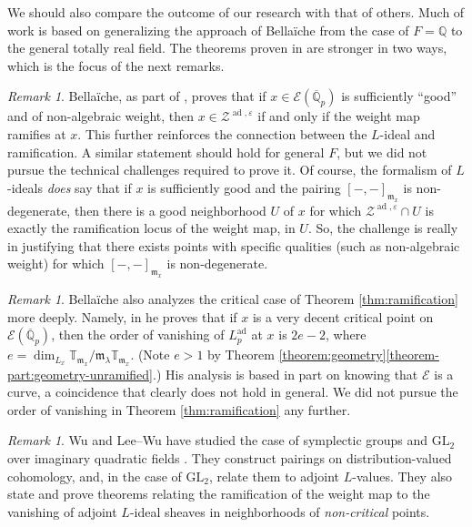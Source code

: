 \documentclass[10pt, twoside]{amsart}
\theoremstyle{plain}
\theoremstyle{definition}
\theoremstyle{remark}
\newtheorem{remark}[theorem]{Remark}
\numberwithin{equation}{subsection}
\def\Q{\mathbb Q}
\def\T{\mathbb{T}}
\def\GL{\mathrm{GL}}
\def\ad{\operatorname{ad}}
\def\gm{\mathfrak m}
\def\scre{\mathscr E}
\def\qpbar{\overline{\mathbb Q}_p}
\begin{document}
We should also compare the outcome of our research with that of others. Much of work is based on generalizing the approach of Bella\"iche from the case of $F = \Q$ to the general totally real field. The theorems proven in \cite[\S 9.4]{Bel} are stronger in two ways, which is the focus of the next remarks.

\begin{remark}
Bella\"iche, as part of \cite[Theorem 9.4.7]{Bel}, proves that if $x \in \scre(\qpbar)$ is sufficiently ``good'' and of non-algebraic weight, then $x \in \mathscr Z^{\ad,\varepsilon}$ if and only if the weight map ramifies at $x$. This further reinforces the connection between the $L$-ideal and ramification. A similar statement should hold for general $F$, but we did not pursue the technical challenges required to prove it. Of course, the formalism of $L$-ideals {\em does} say that if $x$ is sufficiently good and the pairing $[-,-]_{\gm_x}$ is non-degenerate, then there is a good neighborhood $U$ of $x$ for which $\mathscr Z^{\ad,\varepsilon} \cap U$ is exactly the ramification locus of the weight map, in $U$. So, the challenge is really in justifying that there exists points with specific qualities (such as non-algebraic weight) for which $[-,-]_{\gm_x}$ is non-degenerate.
\end{remark}

\begin{remark}
Bella\"iche also analyzes the critical case of Theorem \ref{thm:ramification} more deeply. Namely, in \cite[Theorem 9.4.8(ii)]{Bel} he proves that if $x$ is a very decent critical point on $\scre(\qpbar)$, then the order of vanishing of $L_p^{\ad}$ at $x$ is $2e-2$, where $e = \dim_{L_x} \T_{\gm_x}/\gm_\lambda \T_{\gm_x}$. (Note $e > 1$ by Theorem \ref{theorem:geometry}\ref{theorem-part:geometry-unramified}.) His analysis is based in part on knowing that $\scre$ is a curve, a coincidence that clearly does not hold in general. We did not pursue the order of vanishing in Theorem \ref{thm:ramification} any further.
\end{remark}

\begin{remark}
Wu and Lee--Wu have studied the case of symplectic groups and $\GL_2$ over imaginary quadratic fields \cite{Wu,LeeWu-AdjointBianchi}. They construct pairings on distribution-valued cohomology, and, in the case of $\GL_2$, relate them to adjoint $L$-values. They also state and prove theorems relating the ramification of the weight map to the vanishing of adjoint $L$-ideal sheaves in neighborhoods of {\em non-critical} points.
\end{remark}
\end{document}
